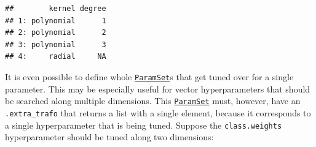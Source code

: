 \documentclass[
]{scrbook}
\newenvironment{Shaded}{\begin{snugshade}}{\end{snugshade}}
\newcommand{\AttributeTok}[1]{\textcolor[rgb]{0.77,0.63,0.00}{#1}}
\newcommand{\ConstantTok}[1]{\textcolor[rgb]{0.00,0.00,0.00}{#1}}
\newcommand{\ControlFlowTok}[1]{\textcolor[rgb]{0.13,0.29,0.53}{\textbf{#1}}}
\newcommand{\DecValTok}[1]{\textcolor[rgb]{0.00,0.00,0.81}{#1}}
\newcommand{\FloatTok}[1]{\textcolor[rgb]{0.00,0.00,0.81}{#1}}
\newcommand{\FunctionTok}[1]{\textcolor[rgb]{0.00,0.00,0.00}{#1}}
\newcommand{\NormalTok}[1]{#1}
\newcommand{\OtherTok}[1]{\textcolor[rgb]{0.56,0.35,0.01}{#1}}
\newcommand{\SpecialCharTok}[1]{\textcolor[rgb]{0.00,0.00,0.00}{#1}}
\renewenvironment{Shaded} {\begin{snugshade}\small} {\end{snugshade}}
\begin{document}
\begin{Shaded}
\end{Shaded}

\begin{verbatim}
##        kernel degree
## 1: polynomial      1
## 2: polynomial      2
## 3: polynomial      3
## 4:     radial     NA
\end{verbatim}

It is even possible to define whole \href{https://paradox.mlr-org.com/reference/ParamSet.html}{\texttt{ParamSet}}s that get tuned over for a single parameter.
This may be especially useful for vector hyperparameters that should be searched along multiple dimensions.
This \href{https://paradox.mlr-org.com/reference/ParamSet.html}{\texttt{ParamSet}} must, however, have an \texttt{.extra\_trafo} that returns a list with a single element, because it corresponds to a single hyperparameter that is being tuned.
Suppose the \texttt{class.weights} hyperparameter should be tuned along two dimensions:

\begin{Shaded}
\end{Shaded}
\end{document}
